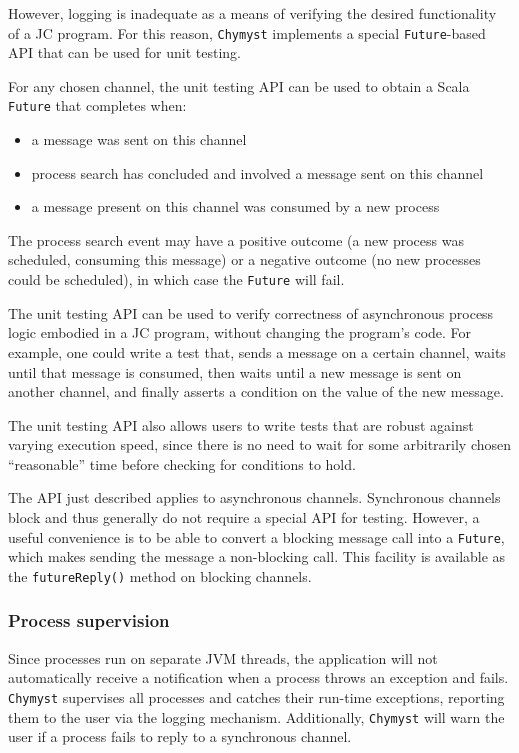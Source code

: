 \documentclass[sigplan,10pt,review,anonymous]{acmart}\settopmatter{printfolios=true}
\begin{document}
However, logging is inadequate as a means of verifying the desired
functionality of a JC program. For this reason, \texttt{Chymyst} implements
a special \texttt{Future}-based API that can be used for unit testing. 

For any chosen channel, the unit testing API can be used to obtain
a Scala \texttt{Future} that completes when: 
\begin{itemize}
\item a message was sent on this channel
\item process search has concluded and involved a message sent on this channel
\item a message present on this channel was consumed by a new process
\end{itemize}
The process search event may have a positive outcome (a new process
was scheduled, consuming this message) or a negative outcome (no new
processes could be scheduled), in which case the \texttt{Future} will
fail.

The unit testing API can be used to verify correctness of asynchronous
process logic embodied in a JC program, without changing the program's
code. For example, one could write a test that, sends a message on
a certain channel, waits until that message is consumed, then waits
until a new message is sent on another channel, and finally asserts
a condition on the value of the new message.

The unit testing API also allows users to write tests that are robust
against varying execution speed, since there is no need to wait for
some arbitrarily chosen ``reasonable'' time before checking for
conditions to hold.

The API just described applies to asynchronous channels. Synchronous
channels block and thus generally do not require a special API for
testing. However, a useful convenience is to be able to convert a
blocking message call into a \texttt{Future}, which makes sending
the message a non-blocking call. This facility is available as the
\texttt{futureReply()} method on blocking channels.

\subsubsection{Process supervision}

Since processes run on separate JVM threads, the application will
not automatically receive a notification when a process throws an
exception and fails. \texttt{Chymyst} supervises all processes and
catches their run-time exceptions, reporting them to the user via
the logging mechanism. Additionally, \texttt{Chymyst} will warn the
user if a process fails to reply to a synchronous channel.
\end{document}
